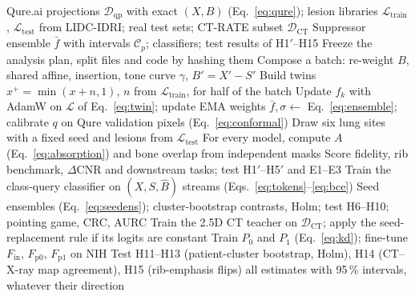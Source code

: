 \begin{algorithm}[!t]
\caption{Training, counterfactual audit and cross-modality evaluation}
\label{alg:pipeline}
\footnotesize
\begin{algorithmic}[1]
\REQUIRE Qure.ai projections $\mathcal{D}_{\mathrm{qp}}$ with exact $(X,B)$ (Eq.~\eqref{eq:qure}); lesion libraries
 $\mathcal{L}_{\mathrm{train}}$, $\mathcal{L}_{\mathrm{test}}$ from LIDC-IDRI; real test sets; CT-RATE subset $\mathcal{D}_{\mathrm{CT}}$
\ENSURE Suppressor ensemble $\bar f$ with intervals $\mathcal{C}_p$; classifiers; test results of H1$'$--H15
\STATE Freeze the analysis plan, split files and code by hashing them
  \STATE Compose a batch: re-weight $B$, shared affine, insertion, tone curve $\gamma$, $B'=X'-S'$
  \STATE Build twins $x^{+}=\min(x+n,1)$, $n$ from $\mathcal{L}_{\mathrm{train}}$, for half of the batch
  \STATE Update $f_k$ with AdamW on $\mathcal{L}$ of Eq.~\eqref{eq:twin}; update EMA weights
 \ENDFOR
\ENDFOR
\STATE $\bar f,\sigma\gets$ Eq.~\eqref{eq:ensemble}; calibrate $q$ on Qure validation pixels (Eq.~\eqref{eq:conformal})
 \STATE Draw six lung sites with a fixed seed and lesions from $\mathcal{L}_{\mathrm{test}}$
 \STATE For every model, compute $A$ (Eq.~\eqref{eq:absorption}) and bone overlap from independent masks
\ENDFOR
\STATE Score fidelity, rib benchmark, $\Delta$CNR and downstream tasks; test H1$'$--H5$'$ and E1--E3
 \STATE Train the class-query classifier on $(X,S,\hat B)$ streams (Eqs.~\eqref{eq:tokens}--\eqref{eq:bce})
\ENDFOR
\STATE Seed ensembles (Eq.~\eqref{eq:seedens}); cluster-bootstrap contrasts, Holm; test H6--H10; pointing game, CRC, AURC
 \STATE Train the 2.5D CT teacher on $\mathcal{D}_{\mathrm{CT}}$; apply the seed-replacement rule if its logits are constant
 \STATE Train $P_0$ and $P_1$ (Eq.~\eqref{eq:kd}); fine-tune $F_{\mathrm{in}}$, $F_{\mathrm{p0}}$, $F_{\mathrm{p1}}$ on NIH
\ENDFOR
\STATE Test H11--H13 (patient-cluster bootstrap, Holm), H14 (CT--X-ray map agreement), H15 (rib-emphasis flips)
\RETURN all estimates with 95\,\% intervals, whatever their direction
\end{algorithmic}
\end{algorithm}

